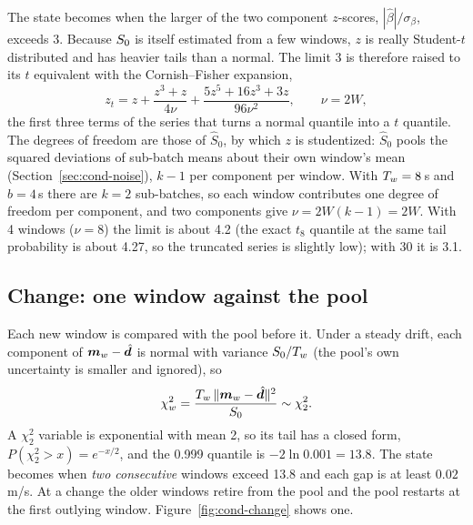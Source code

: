 The state becomes  when the larger of the two component $z$-scores,
$|\hat\beta|/\sigma_\beta$, exceeds 3. Because $S_0$ is itself estimated from a
few windows, $z$ is really Student-$t$ distributed and has heavier tails than a
normal. The limit 3 is therefore raised to its $t$ equivalent with the
Cornish--Fisher expansion,
\[
  z_t = z + \frac{z^3+z}{4\nu} + \frac{5z^5 + 16z^3 + 3z}{96\nu^2},\qquad \nu = 2W,
\]
the first three terms of the series that turns a normal quantile into a $t$
quantile. The degrees of freedom are those of $\hat S_0$, by which $z$ is
studentized: $\hat S_0$ pools the squared deviations of sub-batch means about
their own window's mean (Section~\ref{sec:cond-noise}), $k - 1$ per component per
window. With $T_w = 8$\,s and $b = 4$\,s there are $k = 2$ sub-batches, so each
window contributes one degree of freedom per component, and two components give
$\nu = 2W(k-1) = 2W$. With 4 windows ($\nu = 8$) the limit is about 4.2 (the exact
$t_8$ quantile at the same tail probability is about 4.27, so the truncated series
is slightly low); with 30 it is 3.1.

\subsection{Change: one window against the pool}

Each new window is compared with the pool before it. Under a steady drift, each
component of $\bm m_w - \hat{\bm d}$ is normal with variance $S_0/T_w$ (the pool's own
uncertainty is smaller and ignored), so
\[
  \chi^2_w = \frac{T_w\,\|\bm m_w - \hat{\bm d}\|^2}{S_0} \sim \chi^2_2 .
\]
A $\chi^2_2$ variable is exponential with mean 2, so its tail has a closed form,
$P(\chi^2_2 > x) = e^{-x/2}$, and the 0.999 quantile is $-2\ln 0.001 = 13.8$. The
state becomes  when \emph{two consecutive} windows exceed 13.8
and each gap is at least $0.02$\,m/s. At a change the older windows retire from the pool and the pool restarts at the first outlying
window. Figure~\ref{fig:cond-change} shows one.

